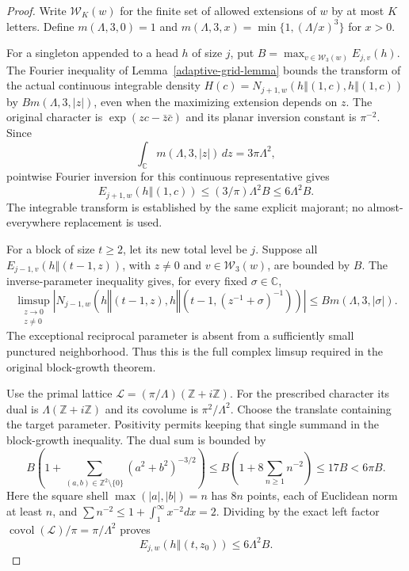 \begin{proof}
Write $\mathcal W_K(w)$ for the finite set of allowed extensions
of $w$ by at most $K$ letters.  Define
$m(\Lambda,3,0)=1$ and
$m(\Lambda,3,x)=\min\{1,(\Lambda/x)^3\}$ for $x>0$.

For a singleton appended to a head $h$ of size $j$, put
$B=\max_{v\in\mathcal W_3(w)}E_{j,v}(h)$.
The Fourier inequality of Lemma~\ref{adaptive-grid-lemma}
bounds the transform of the actual continuous integrable density
$H(c)=N_{j+1,w}(h\mathbin\Vert(1,c),h\mathbin\Vert(1,c))$
by $B m(\Lambda,3,|z|)$, even when the maximizing extension
depends on $z$.  The original character is
$\exp(zc-\bar z\bar c)$ and its planar inversion constant is
$\pi^{-2}$.  Since
\[
 \int_{\mathbb C}m(\Lambda,3,|z|)\,dz=3\pi\Lambda^2,
\]
pointwise Fourier inversion for this continuous representative gives
\begin{equation}\label{adaptive-singleton-step}
 E_{j+1,w}(h\mathbin\Vert(1,c))
       \le(3/\pi)\Lambda^2B\le6\Lambda^2B.
\end{equation}
The integrable transform is established by the same explicit
majorant; no almost-everywhere replacement is used.

For a block of size $t\ge2$, let its new total level be $j$.
Suppose all $E_{j-1,v}(h\mathbin\Vert(t-1,z))$, with
$z\ne0$ and $v\in\mathcal W_3(w)$, are bounded by $B$.
The inverse-parameter inequality gives, for every fixed
$\sigma\in\mathbb C$,
\[
 \limsup_{\substack{z\to0\\z\ne0}}
 \left|N_{j-1,w}\left(h\mathbin\Vert(t-1,z),
 h\mathbin\Vert(t-1,(z^{-1}+\sigma)^{-1})\right)\right|
 \le B m(\Lambda,3,|\sigma|).
\]
The exceptional reciprocal parameter is absent from a sufficiently
small punctured neighborhood.  Thus this is the full complex
limsup required in the original block-growth theorem.

Use the primal lattice
$\mathscr L=(\pi/\Lambda)(\mathbb Z+i\mathbb Z)$.
For the prescribed character its dual is
$\Lambda(\mathbb Z+i\mathbb Z)$ and its covolume is
$\pi^2/\Lambda^2$.  Choose the translate containing the target
parameter.  Positivity permits keeping that single summand in the
block-growth inequality.  The dual sum is bounded by
\[
 B\left(1+\sum_{(a,b)\in\mathbb Z^2\setminus\{0\}}
              (a^2+b^2)^{-3/2}\right)
 \le B\left(1+8\sum_{n\ge1}n^{-2}\right)
 \le17B<6\pi B.
\]
Here the square shell $\max(|a|,|b|)=n$ has $8n$ points,
each of Euclidean norm at least $n$, and
$\sum n^{-2}\le1+\int_1^\infty x^{-2}dx=2$.
Dividing by the exact left factor
$\operatorname{covol}(\mathscr L)/\pi=\pi/\Lambda^2$
proves
\begin{equation}\label{adaptive-block-step}
 E_{j,w}(h\mathbin\Vert(t,z_0))\le6\Lambda^2B.
\end{equation}


\end{proof}
